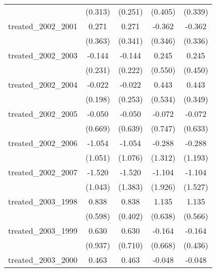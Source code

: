 {\begin{tabular}{l*{4}{c}}
            &     (0.313)         &     (0.251)         &     (0.405)         &     (0.339)         \\
[1em]
treated\_2002\_2001&       0.271         &       0.271         &      -0.362         &      -0.362         \\
            &     (0.363)         &     (0.341)         &     (0.346)         &     (0.336)         \\
[1em]
treated\_2002\_2003&      -0.144         &      -0.144         &       0.245         &       0.245         \\
            &     (0.231)         &     (0.222)         &     (0.550)         &     (0.450)         \\
[1em]
treated\_2002\_2004&      -0.022         &      -0.022         &       0.443         &       0.443         \\
            &     (0.198)         &     (0.253)         &     (0.534)         &     (0.349)         \\
[1em]
treated\_2002\_2005&      -0.050         &      -0.050         &      -0.072         &      -0.072         \\
            &     (0.669)         &     (0.639)         &     (0.747)         &     (0.633)         \\
[1em]
treated\_2002\_2006&      -1.054         &      -1.054         &      -0.288         &      -0.288         \\
            &     (1.051)         &     (1.076)         &     (1.312)         &     (1.193)         \\
[1em]
treated\_2002\_2007&      -1.520         &      -1.520         &      -1.104         &      -1.104         \\
            &     (1.043)         &     (1.383)         &     (1.926)         &     (1.527)         \\
[1em]
treated\_2003\_1998&       0.838         &       0.838\sym{*}  &       1.135         &       1.135\sym{*}  \\
            &     (0.598)         &     (0.402)         &     (0.638)         &     (0.566)         \\
[1em]
treated\_2003\_1999&       0.630         &       0.630         &      -0.164         &      -0.164         \\
            &     (0.937)         &     (0.710)         &     (0.668)         &     (0.436)         \\
[1em]
treated\_2003\_2000&       0.463         &       0.463         &      -0.048         &      -0.048         \\

\end{tabular}}
